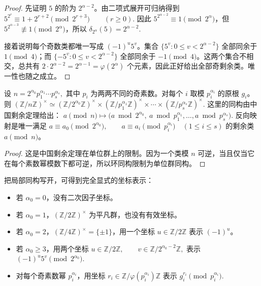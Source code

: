 \documentclass[oneside]{AJbook}
\newcommand{\Z}{\mathbb Z}
\newcommand{\U}[1]{(\Z/#1\Z)^\times}
\newcommand{\Cyc}[1]{\Z/#1\Z}
\begin{document}
\begin{proof}
先证明 $5$ 的阶为 $2^{\alpha-2}$。由二项式展开可归纳得到
\(
  5^{2^r}\equiv 1+2^{r+2}\pmod {2^{r+3}}\qquad(r\ge 0).
\)
因此 $5^{2^{\alpha-2}}\equiv 1\pmod {2^\alpha}$，但
$5^{2^{\alpha-3}}\not\equiv 1\pmod {2^\alpha}$，所以
\(
  \delta_{2^\alpha}(5)=2^{\alpha-2}.
\)

接着说明每个奇数类都唯一写成 $(-1)^u5^v$。集合
\(
  \{5^v:0\le v<2^{\alpha-2}\}
\)
全部同余于 $1\pmod 4$；而
\(
  \{-5^v:0\le v<2^{\alpha-2}\}
\)
全部同余于 $-1\pmod 4$。这两个集合不相交，总共有
$2\cdot 2^{\alpha-2}=2^{\alpha-1}=\varphi(2^\alpha)$ 个元素，因此正好给出全部奇剩余类。唯一性也随之成立。
\end{proof}

\begin{theorem}[一般结构定理]
设
\(
  n=2^{\alpha_0}p_1^{\alpha_1}\cdots p_s^{\alpha_s},
\)
其中 $p_i$ 为两两不同的奇素数。对每个 $i$ 取模 $p_i^{\alpha_i}$ 的原根 $g_i$。则
\(
  \U n
  \simeq
  \U{2^{\alpha_0}}
  \times
  \U{p_1^{\alpha_1}}
  \times\cdots\times
  \U{p_s^{\alpha_s}}.
\)
这里的同构由中国剩余定理给出：
\(
  a\pmod n
  \longmapsto
  \bigl(a\bmod 2^{\alpha_0},\ a\bmod p_1^{\alpha_1},\ldots,a\bmod p_s^{\alpha_s}\bigr).
\)
反向映射是唯一满足
\(
  a\equiv a_0\pmod {2^{\alpha_0}},\qquad
  a\equiv a_i\pmod {p_i^{\alpha_i}}\quad(1\le i\le s)
\)
的剩余类 $a\pmod n$。
\end{theorem}

\begin{proof}
这是中国剩余定理在单位群上的限制。因为一个类模 $n$ 可逆，当且仅当它在每个素数幂模数下都可逆，所以环同构限制为单位群同构。
\end{proof}

把局部同构写开，可得到完全显式的坐标表示：

\begin{itemize}[leftmargin=2em]
  \item 若 $\alpha_0=0$，没有二次因子坐标。
  \item 若 $\alpha_0=1$，$\U2$ 为平凡群，也没有有效坐标。
  \item 若 $\alpha_0=2$，$\U4=\{\pm1\}$，用一个坐标 $u\in\Cyc2$ 表示 $(-1)^u$。
  \item 若 $\alpha_0\ge3$，用两个坐标
  \(
    u\in\Cyc2,\qquad v\in\Cyc{2^{\alpha_0-2}},
  \)
  表示
  \(
    (-1)^u5^v\pmod {2^{\alpha_0}}.
  \)
  \item 对每个奇素数幂 $p_i^{\alpha_i}$，用坐标
  \(
    r_i\in \Cyc{\varphi(p_i^{\alpha_i})}
  \)
  表示
  \(
    g_i^{r_i}\pmod {p_i^{\alpha_i}}.
  \)
\end{itemize}
\end{document}
